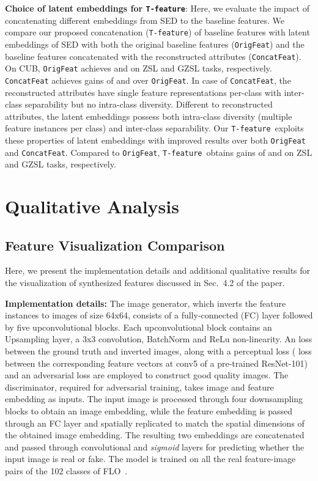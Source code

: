 \documentclass[runningheads]{llncs}
\newcommand{\featcat}{\texttt{T-feature}}
\begin{document}
\noindent\textbf{Choice of latent embeddings for \featcat}: Here, we evaluate the impact of concatenating different embeddings from SED to the baseline features.  We compare our proposed concatenation (\featcat) of baseline features with latent embeddings  of SED with both the original baseline features (\texttt{OrigFeat}) and the baseline features concatenated with the reconstructed attributes (\texttt{ConcatFeat}). On CUB, \texttt{OrigFeat} achieves  and  on ZSL and GZSL tasks, respectively. \texttt{ConcatFeat} achieves gains of  and  over \texttt{OrigFeat}.
In case of \texttt{ConcatFeat}, the reconstructed attributes have single feature representations per-class with inter-class separability but no intra-class diversity. Different to reconstructed attributes, the latent embeddings  possess both intra-class diversity (multiple feature instances per class) and inter-class separability. Our \featcat~exploits these properties of latent embeddings with improved results over both \texttt{OrigFeat} and \texttt{ConcatFeat}. Compared to \texttt{OrigFeat}, \featcat~obtains gains of  and  on ZSL and GZSL tasks, respectively.



\section{Qualitative Analysis\label{sec_qual_res}}



\subsection{Feature Visualization Comparison\label{sec_feat_viz}}
Here, we present the implementation details and additional qualitative results for the visualization of synthesized features discussed in Sec.~4.2 of the paper. 

\noindent\textbf{Implementation details:} The image generator, which inverts the feature instances to images of size 64x64, consists of a fully-connected (FC) layer followed by five upconvolutional blocks. Each upconvolutional block contains an Upsampling layer, a 3x3 convolution, BatchNorm and ReLu non-linearity. An  loss between the ground truth and inverted images, along with a perceptual loss ( loss between the corresponding feature vectors at conv5 of a pre-trained ResNet-101) and an adversarial loss are employed to construct good quality images. The discriminator, required for adversarial training, takes image and feature embedding as inputs. The input image is processed through four downsampling blocks to obtain an image embedding, while the feature embedding is passed through an FC layer and spatially replicated to match the spatial dimensions of the obtained image embedding. The resulting two embeddings are concatenated and passed through convolutional and \textit{sigmoid} layers for predicting whether the input image is real or fake. The model is trained on all the real feature-image pairs of the 102 classes of FLO~\cite{flo}.
\end{document}
